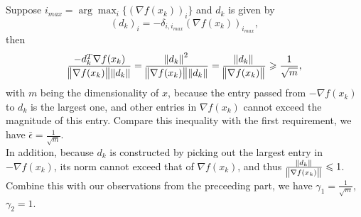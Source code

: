 \documentclass[11pt]{article}
\begin{document}
\section{}
Suppose $i_{max}=\arg\max_{i}\{(\nabla f(x_k))_i\}$ and $d_k$ is given by $$(d_k)_i=-\delta_{i,i_{max}}(\nabla f(x_k))_{i_{max}},$$ then $$\frac{-d_k^T\nabla f(x_k)}{\norm{\nabla f(x_k)}\norm{d_k}}=\frac{\norm{d_k}^2}{\norm{\nabla f(x_k)}\norm{d_k}}=\frac{\norm{d_k}}{\norm{\nabla f(x_k)}}\geqslant\frac1{\sqrt{m}}, $$ with $m$ being the dimensionality of $x$, because the entry passed from $-\nabla f(x_k)$ to $d_k$ is the largest one, and other entries in $\nabla f(x_k)$ cannot exceed the magnitude of this entry. Compare this inequality with the first requirement, we have $\bar{\epsilon}=\frac1{\sqrt{m}}$.\\[0.5cm]
In addition, because $d_k$ is constructed by picking out the largest entry in $-\nabla f(x_k)$, its norm cannot exceed that of $\nabla f(x_k)$, and thus $\frac{\norm{d_k}}{\norm{\nabla f(x_k)}}\leqslant1$. Combine this with our observations from the preceeding part, we have $\gamma_1=\frac1{\sqrt{ m}}$, $\gamma_2=1$.
\end{document}

